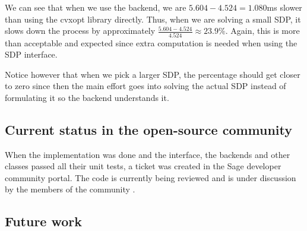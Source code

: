 We can see that when we use the backend, we are $5.604 - 4.524 = 1.080$ms slower than using the cvxopt library directly. Thus, when we are solving a small SDP, it slows down the process by approximately 
$\frac{5.604 - 4.524}{4.524} \approx 23.9\%$. Again, this is more than acceptable and expected since extra computation is needed when using the SDP interface. 

Notice however that when we pick a larger SDP, the percentage should get closer to zero since then the main effort goes into solving the actual SDP instead of formulating it so the backend understands it.


	\subsection{Current status in the open-source community}
When the implementation was done and the interface, the backends and other classes passed all their unit tests, a ticket was created in the Sage developer community portal. The code is currently being reviewed and is under discussion by the members of the community \cite{ticketsdp}.
	

	\subsection{Future work}
	
	
